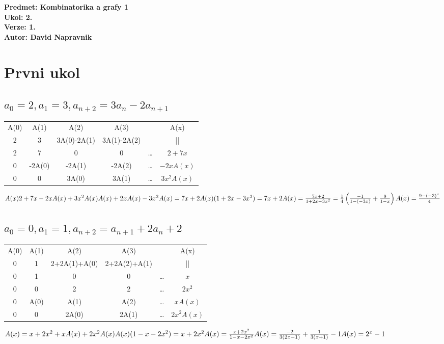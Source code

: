 \documentclass[a4paper]{article}
\begin{document}
\noindent
\textbf{Predmet: Kombinatorika a grafy 1}\\
\textbf{Ukol: 2.}\\
\textbf{Verze: 1.}\\
\textbf{Autor: David Napravnik}

\section*{Prvni ukol}
\subsection*{$a_0 = 2, a_1=3, a_{n+2} = 3a_n-2a_{n+1}$}

\begin{tabular}{ c c c c c c }
	A(0) & A(1) & A(2) & A(3) & & A(x)\\ 
	2 & 3 & 3A(0)-2A(1) & 3A(1)-2A(2) & & ||\\ 
	\hline
	2 & 7 & 0 & 0 & \dots & $2+7x$\\ 
	0 & -2A(0) & -2A(1) & -2A(2) & \dots & $-2xA(x)$\\ 
	0 & 0 & 3A(0) & 3A(1) & \dots & $3x^2A(x)$\\
\end{tabular}
\noindent
$A(x)2+7x-2xA(x)+3x^2A(x)\\
A(x)+2xA(x)-3x^2A(x) = 7x+2\\
A(x)(1+2x-3x^2) = 7x+2\\
A(x) = \frac{7x+2}{1+2x-3x^2} = \frac{1}{4}\left(\frac{-1}{1-(-3x)}+\frac{9}{1-x}\right)\\
A(x) = \frac{9-(-3)^x}{4}
$


\subsection*{$a_0 = 0, a_1=1, a_{n+2} = a_{n+1} + 2a_n + 2$}

\begin{tabular}{ c c c c c c }
	A(0) & A(1) & A(2) & A(3) & & A(x)\\ 
	0 & 1 & 2+2A(1)+A(0) & 2+2A(2)+A(1) & & ||\\ 
	\hline
	0 & 1 & 0 & 0 & \dots & $x$\\ 
	0 & 0 & 2 & 2 & \dots & $2x^2$\\ 
	0 & A(0) & A(1) & A(2) & \dots & $xA(x)$\\ 
	0 & 0 & 2A(0) & 2A(1) & \dots & $2x^2A(x)$\\
\end{tabular}
\noindent
$
A(x)= x+2x^2+x A(x)+2x^2A(x)\\
A(x)(1-x-2x^2) = x+2x^2\\
A(x) = \frac{x+2x^2}{1-x-2x^2}\\
A(x) = \frac{-2}{3(2x-1)}+\frac{1}{3(x+1)}-1\\
A(x) = 2^x-1\\
$
\end{document}
